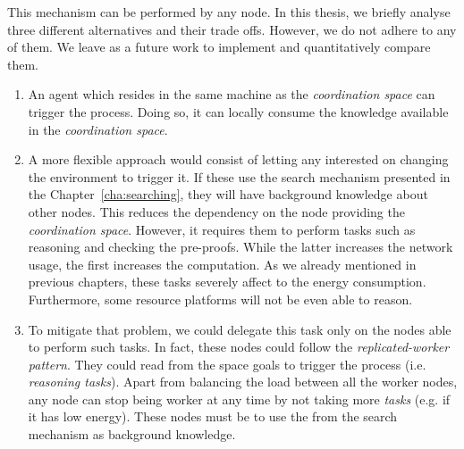 This mechanism can be performed by any node.
In this thesis, we briefly analyse three different alternatives and their trade offs.
However, we do not adhere to any of them.
We leave as a future work to implement and quantitatively compare them.

\begin{enumerate}
  \item An agent which resides in the same machine as the \emph{coordination space} can trigger the process. %
	Doing so, it can locally consume the knowledge available in the \emph{coordination space}.
  \item A more flexible approach would consist of letting any \consumer{} interested on changing the environment to trigger it.
	If these \consumers{} use the search mechanism presented in the Chapter~\ref{cha:searching}, they will have background knowledge about other nodes.
	This reduces the dependency on the node providing the \emph{coordination space}. %
	However, it requires them to perform tasks such as reasoning and checking the pre-proofs.
	While the latter increases the network usage, the first increases the computation.
	As we already mentioned in previous chapters, these tasks severely affect to the energy consumption.
	Furthermore, some resource platforms will not be even able to reason.
  \item To mitigate that problem, we could delegate this task only on the nodes able to perform such tasks.
	In fact, these nodes could follow the \emph{replicated-worker pattern}.
	They could read from the space goals to trigger the process (i.e. \emph{reasoning tasks}).
	Apart from balancing the load between all the worker nodes, any node can stop being worker at any time by not taking more \emph{tasks} (e.g. if it has low energy).
	These nodes must be \consumers{} to use the \clues{} from the search mechanism as background knowledge.
\end{enumerate}






